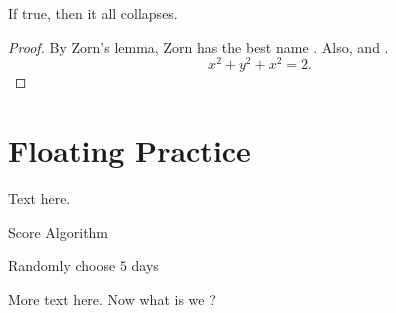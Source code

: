 \begin{theorem}
    If true, then it all collapses.
\end{theorem}
\begin{proof}
    By Zorn's lemma, Zorn has the best name \autocite{martiniCompleteReducedConvex2019}.
    Also, \autocite{chenGraphHomotopyGraham2001} and \autocite{dochtermannMinimalGraphsContractible2023}.
    \[x^2+y^2+x^2=2.\]

\end{proof}
\section{Floating Practice}
Text here.

\begin{algorithm}
    \caption{Score Algorithm}
    \begin{algorithmic}[1]
        \Statex
        \State Randomly choose $5$ days
        \EndFor
        \EndFor
    \end{algorithmic}
\end{algorithm}

More text here. Now what is we ?


\printbibliography[heading=subbibnumbered]

